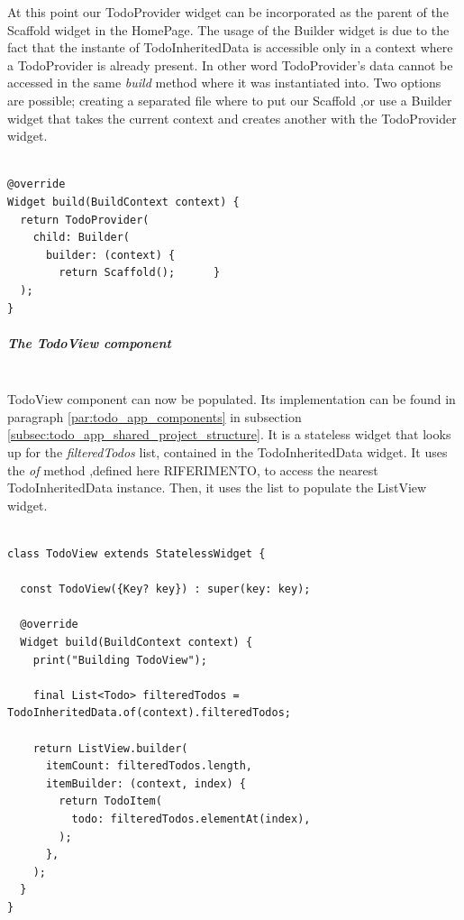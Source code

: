 At this point our TodoProvider widget can be incorporated as the parent of the Scaffold widget in the HomePage. The usage of the Builder widget is due to the fact that the instante of TodoInheritedData is accessible only in a context where a TodoProvider is already present. In other word TodoProvider’s data cannot be accessed in the same \textit{build } method where it was instantiated into. Two options are possible; creating a separated file where to put our Scaffold ,or use a Builder widget that takes the current context and creates another with the TodoProvider widget.
\mbox{}\\
\begin{code}

 \mbox{}

\begin{verbatim}

@override
Widget build(BuildContext context) {
  return TodoProvider(
    child: Builder(
      builder: (context) {
        return Scaffold();      }
  );
}
\end{verbatim}
\end{code}
\subparagraph{The TodoView component}\mbox{}\\
\label{subpar:todo_app_inherited_widget_todoview_component}
TodoView component can now be populated. Its implementation can be found in paragraph \ref{par:todo_app_components} in subsection \ref{subsec:todo_app_shared_project_structure}. It is a stateless widget that looks up for the \textit{filteredTodos} list, contained in the TodoInheritedData widget. It uses the \textit{of} method ,defined here RIFERIMENTO, to access the nearest TodoInheritedData instance. Then, it uses the list to populate the ListView widget. 
\mbox{}\\

\begin{code}
 \mbox{}

\begin{verbatim}

class TodoView extends StatelessWidget {

  const TodoView({Key? key}) : super(key: key);

  @override
  Widget build(BuildContext context) {
    print("Building TodoView");

    final List<Todo> filteredTodos = TodoInheritedData.of(context).filteredTodos;

    return ListView.builder(
      itemCount: filteredTodos.length,
      itemBuilder: (context, index) {
        return TodoItem(
          todo: filteredTodos.elementAt(index),
        );
      },
    );
  }
}
\end{verbatim}
\end{code}

